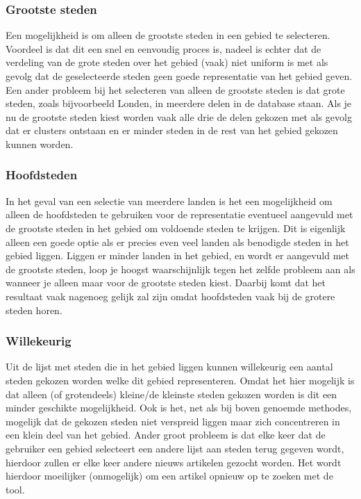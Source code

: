 \documentclass[twoside,openright]{uva-bachelor-thesis}
\begin{document}
			\subsubsection{Grootste steden}
				Een mogelijkheid is om alleen de grootste steden in een gebied te selecteren. Voordeel is dat dit een snel en eenvoudig proces is, nadeel is echter dat de verdeling van de grote steden over het gebied (vaak) niet uniform is met als gevolg dat de geselecteerde steden geen goede representatie van het gebied geven.
				Een ander probleem bij het selecteren van alleen de grootste steden is dat grote steden, zoals bijvoorbeeld Londen, in meerdere delen in de database staan. Als je nu de grootste steden kiest worden vaak alle drie de delen gekozen met als gevolg dat er clusters ontstaan en er minder steden in de rest van het gebied gekozen kunnen worden.
			\subsubsection{Hoofdsteden}
				In het geval van een selectie van meerdere landen is het een mogelijkheid om alleen de hoofdsteden te gebruiken voor de representatie eventueel aangevuld met de grootste steden in het gebied om voldoende steden te krijgen. Dit is eigenlijk alleen een goede optie als er precies even veel landen als benodigde steden in het gebied liggen. Liggen er minder landen in het gebied, en wordt er aangevuld met de grootste steden, loop je hoogst waarschijnlijk tegen het zelfde probleem aan als wanneer je alleen maar voor de grootste steden kiest. Daarbij komt dat het resultaat vaak nagenoeg gelijk zal zijn omdat hoofdsteden vaak bij de grotere steden horen. 
			\subsubsection{Willekeurig}
				Uit de lijst met steden die in het gebied liggen kunnen willekeurig een aantal steden gekozen worden welke dit gebied representeren. Omdat het hier mogelijk is dat alleen (of grotendeels) kleine/de kleinste steden gekozen worden is dit een minder geschikte mogelijkheid.  Ook is het, net als bij boven genoemde methodes, mogelijk dat de gekozen steden niet verspreid liggen maar zich concentreren in een klein deel van het gebied. Ander groot probleem is dat elke keer dat de gebruiker een gebied selecteert een andere lijst aan steden terug gegeven wordt, hierdoor zullen er elke keer andere nieuws artikelen gezocht worden. Het wordt hierdoor moeilijker (onmogelijk) om een artikel opnieuw op te zoeken met de tool.
\end{document}
